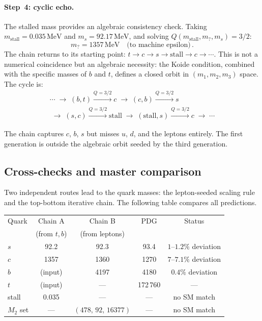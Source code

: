 \documentclass[12pt,a4paper]{article}
\newcommand{\MeV}{\,\text{MeV}}
\begin{document}
\paragraph{Step~4: cyclic echo.}
The stalled mass provides an algebraic consistency check.
Taking $m_{\text{stall}} = 0.035\MeV$ and $m_s = 92.17\MeV$, and
solving $Q(m_{\text{stall}}, m_?, m_s) = 3/2$:
\begin{equation}
m_? = 1357\MeV \quad \text{(to machine epsilon)}\,.
\end{equation}
The chain returns to its starting point: $t \to c \to s \to
\text{stall} \to c \to \cdots$. This is not a numerical coincidence
but an algebraic necessity: the Koide condition, combined with the
specific masses of $b$ and $t$, defines a closed orbit in
$(m_1, m_2, m_3)$ space. The cycle is:
\begin{multline*}
\cdots \;\to\; (b,t) \xrightarrow{Q=3/2} c
\;\to\; (c,b) \xrightarrow{Q=3/2} s \\
\;\to\; (s,c) \xrightarrow{Q=3/2} \text{stall}
\;\to\; (\text{stall}, s) \xrightarrow{Q=3/2} c
\;\to\; \cdots
\end{multline*}

The chain captures $c$, $b$, $s$ but misses $u$, $d$, and the
leptons entirely. The first generation is outside the algebraic
orbit seeded by the third generation.

\subsection{Cross-checks and master comparison}
Two independent routes lead to the quark masses: the
lepton-seeded scaling rule and the
top-bottom iterative chain.
The following table compares all predictions.

\begin{center}
\begin{tabular}{lcccc}
\toprule
Quark & Chain A & Chain B & PDG & Status \\
 & (from $t,b$) & (from leptons) & & \\
\midrule
$s$ & 92.2 & 92.3 & 93.4 & $1\text{--}1.2\%$ deviation \\
$c$ & 1357 & 1360 & 1270 & $7\text{--}7.1\%$ deviation \\
$b$ & (input) & 4197 & 4180 & $0.4\%$ deviation \\
$t$ & (input) & --- & 172\,760 & --- \\
stall & 0.035 & --- & --- & no SM match \\
$M_2$ set & --- & $(478,\,92,\,16377)$ & --- & no SM match \\
\bottomrule
\end{tabular}
\end{center}
\end{document}
